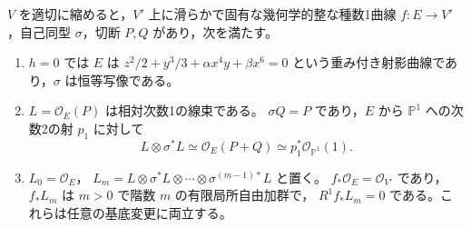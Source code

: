 \begin{lemma}\label{lem:degree-one-resolved-elliptic-curve}
$V$ を適切に縮めると，$V'$ 上に滑らかで固有な幾何学的整な種数1曲線
$f:E\to V'$，自己同型 $\sigma$，切断 $P,Q$ があり，次を満たす。
\begin{enumerate}
 \item $h=0$ では $E$ は
       $z^2/2+y^3/3+\alpha x^4y+\beta x^6=0$
       という重み付き射影曲線であり，$\sigma$ は恒等写像である。
 \item $L=\mathcal O_E(P)$ は相対次数1の線束である。
       $\sigma Q=P$ であり，$E$ から $\mathbb P^1$ への次数2の射 $p_1$ に対して
       \[
        L\otimes\sigma^*L\simeq\mathcal O_E(P+Q)
          \simeq p_1^*\mathcal O_{\mathbb P^1}(1).
       \]
 \item $L_0=\mathcal O_E$，
       $L_m=L\otimes\sigma^*L\otimes\cdots\otimes\sigma^{(m-1)*}L$ と置く。
       $f_*\mathcal O_E=\mathcal O_{V'}$ であり，
       $f_*L_m$ は $m>0$ で階数 $m$ の有限局所自由加群で，
       $R^1f_*L_m=0$ である。これらは任意の基底変更に両立する。
\end{enumerate}
\end{lemma}
